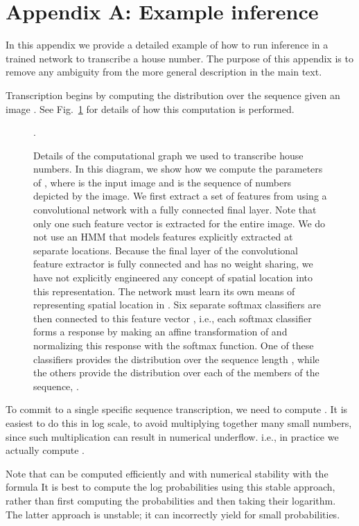 \documentclass{article} \usepackage{comment}
\begin{document}
\section*{Appendix A: Example inference}

In this appendix we provide a detailed example of how to run inference in a trained network
to transcribe a house number. The purpose of this appendix is to remove any ambiguity from
the more general description in the main text.

Transcription begins by computing the distribution over the sequence  given an
image . See Fig.~\ref{fig:detailed_mlp} for details of how this computation is
performed.

\begin{figure}[hb]
\begin{centering}
\caption{Details of the computational graph we used to transcribe house numbers.
In this diagram, we show how we compute the parameters of ,
where  is the input image and  is the sequence of numbers depicted by
the image. We first extract a set of features  from  using a convolutional
network with a fully connected final layer. Note that only one such feature vector is extracted
for the entire image. We do not use an HMM that models features explicitly extracted at separate
locations. Because the final layer of the convolutional feature extractor is fully connected and
has no weight sharing, we have not explicitly engineered any concept of spatial location into this
representation. The network must learn its own means of representing spatial location in .
Six separate softmax classifiers are then connected
to this feature vector , i.e., each softmax classifier forms a response by making an
affine transformation of  and normalizing this response with the softmax function.
One of these classifiers provides the distribution over the sequence length ,
while the others provide the distribution over each of the members of the sequence,
.
}
\label{fig:detailed_mlp}.
\end{centering}
\end{figure}

To commit to a single specific sequence transcription, we need to compute
.
It is easiest to do this in log scale, to avoid multiplying together many
small numbers, since such multiplication can result in numerical underflow.
i.e., in practice we actually compute
.

Note that  can be computed efficiently and
with numerical stability with the formula
 It is best to
compute the log probabilities using this stable approach, rather than first
computing the probabilities and then taking their logarithm. The latter approach
is unstable; it can incorrectly yield  for small probabilities.
\end{document}
